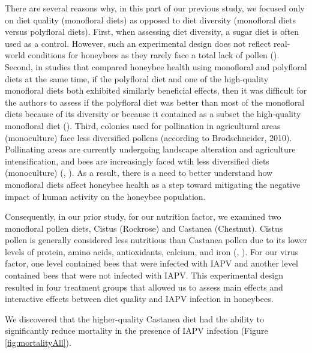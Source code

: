 \documentclass[11pt,a4paper,oldfontcommands,openany]{memoir}
\numberwithin{equation}{section} %
\begin{document}
There are several reasons why, in this part of our previous study, we focused only on diet quality (monofloral diets) as opposed to diet diversity (monofloral diets versus polyfloral diets). First, when assessing diet diversity, a sugar diet is often used as a control. However, such an experimental design does not reflect real-world conditions for honeybees as they rarely face a total lack of pollen (\citealt{DiPasquale}). Second, in studies that compared honeybee health using monofloral and polyfloral diets at the same time, if the polyfloral diet and one of the high-quality monofloral diets both exhibited similarly beneficial effects, then it was difficult for the authors to assess if the polyfloral diet was better than most of the monofloral diets because of its diversity or because it contained as a subset the high-quality monofloral diet (\citealt{DiPasquale}). Third, colonies used for pollination in agricultural areas (monoculture) face less diversified pollens (according to Brodschneider, 2010). Pollinating areas are currently undergoing landscape alteration and agriculture intensification, and bees are increasingly faced wtih less diversified diets (monoculture) (\citealt{landscape1}, \citealt{brodschneider}). As a result, there is a need to better understand how monofloral diets affect honeybee health as a step toward mitigating the negative impact of human activity on the honeybee population.

Consequently, in our prior study, for our nutrition factor, we examined two monofloral pollen diets, Cistus (Rockrose) and Castanea (Chestnut). Cistus pollen is generally considered less nutritious than Castanea pollen due to its lower levels of protein, amino acids, antioxidants, calcium, and iron (\citealt{DiPasquale}, \citealt{adamInt}). For our virus factor, one level contained bees that were infected with IAPV and another level contained bees that were not infected with IAPV. This experimental design resulted in four treatment groups that allowed us to assess main effects and interactive effects between diet quality and IAPV infection in honeybees.

We discovered that the higher-quality Castanea diet had the ability to significantly reduce mortality in the presence of IAPV infection (Figure \ref{fig:mortalityAll}). 
\end{document}

